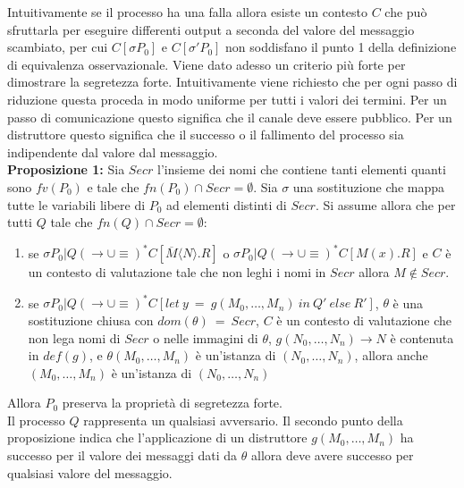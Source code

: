 \documentclass[12pt]{article}
\begin{document}
Intuitivamente se il processo ha una falla allora esiste un contesto $C$ che può sfruttarla per eseguire differenti output a seconda del valore del messaggio scambiato, per cui $C[\sigma P_0]$ e $C[\sigma' P_0]$ non soddisfano il punto 1 della definizione di equivalenza osservazionale. Viene dato adesso un criterio più forte per dimostrare la segretezza forte. Intuitivamente viene richiesto che per ogni passo di riduzione questa proceda in modo uniforme per tutti i valori dei termini. Per un passo di comunicazione questo significa che il canale deve essere pubblico. Per un distruttore questo significa che il successo o il fallimento del processo sia indipendente dal valore dal messaggio.\\

\textbf{Proposizione 1:} Sia $Secr$ l'insieme dei nomi che contiene tanti elementi quanti sono $fv(P_0)$  e tale che $fn(P_0) \cap Secr = \emptyset$. Sia $\sigma$ una sostituzione che mappa tutte le variabili libere di $P_0$ ad elementi distinti di $Secr$. Si assume allora che per tutti $Q$ tale che $fn(Q) \cap Secr = \emptyset$:
\begin{enumerate}
    \item se $\sigma P_0 | Q (\rightarrow \cup \equiv)^* C[\overline{M} \langle N \rangle . R]$ o $\sigma P_0 | Q (\rightarrow \cup \equiv)^* C[M(x).R]$ e $C$ è un contesto di valutazione tale che non leghi i nomi in $Secr$ allora $M \notin Secr$.
    
    \item se $\sigma P_0 | Q (\rightarrow \cup \equiv)^* C[let\ y\ =\ g(M_0,\dots,M_n)\ in\ Q'\ else\ R']$, $\theta$ è una sostituzione chiusa con $dom(\theta)\ =\ Secr$, $C$ è un contesto di valutazione che non lega nomi di $Secr$ o nelle immagini di $\theta$, $g(N_0,\dots,N_n) \rightarrow N$ è contenuta in $def(g)$, e $\theta (M_0,\dots,M_n)$ è un'istanza di $(N_0,\dots,N_n)$, allora anche $(M_0,\dots,M_n)$ è un'istanza di $(N_0,\dots,N_n)$   
\end{enumerate}
Allora $P_0$ preserva la proprietà di segretezza forte.\\

Il processo $Q$ rappresenta un qualsiasi avversario. Il secondo punto della proposizione indica che l'applicazione di un distruttore $g(M_0,\dots,M_n)$ ha successo per il valore dei messaggi dati da $\theta$ allora deve avere successo per qualsiasi valore del messaggio.\\ 
\end{document}
